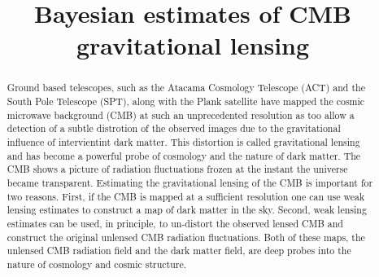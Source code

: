 \documentclass[noinfoline]{imsart}
\begin{document}
\begin{frontmatter}
\title{Bayesian estimates of CMB gravitational lensing}

\begin{abstract} 
Ground based telescopes, such as the Atacama Cosmology Telescope (ACT)  and  the South Pole Telescope (SPT), along with the Plank satellite have mapped the  cosmic microwave background (CMB) at such an unprecedented resolution as too allow a detection of a subtle distrotion of the observed images due to the gravitational influence of intervientint dark matter. This distortion is called  gravitational lensing and has become a  powerful probe of cosmology and the nature of dark matter.
The CMB shows a picture of radiation fluctuations frozen at the instant the universe became transparent. Estimating the gravitational lensing of the CMB  is important for two reasons. First, if the CMB is mapped at a sufficient resolution one can use weak lensing estimates to construct a map of dark matter in the sky.
Second,  weak lensing estimates  can be used, in principle,  to un-distort the observed lensed CMB and construct the original unlensed CMB radiation fluctuations. Both of these maps,  the unlensed CMB radiation field and the dark matter field, are deep probes into the nature of cosmology and cosmic structure. 
\end{abstract}

\begin{keyword}
\end{keyword}

\end{frontmatter}
\end{document}

